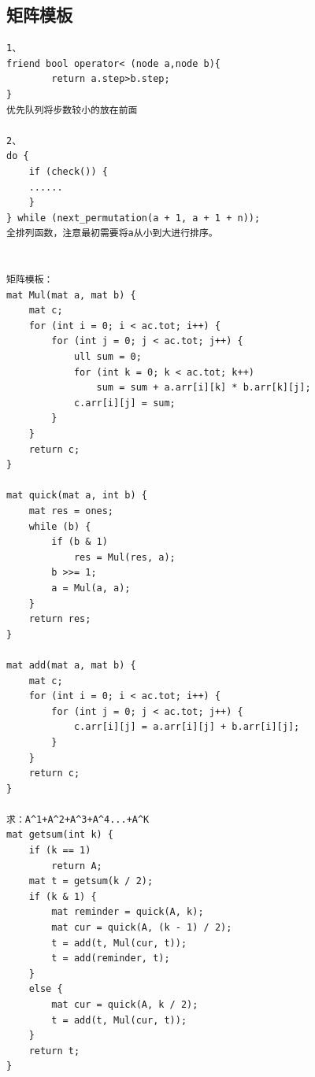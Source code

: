 \documentclass[twoside]{article}
\begin{document}
\subsection{矩阵模板}
\begin{lstlisting}
1、
friend bool operator< (node a,node b){
		return a.step>b.step;
}
优先队列将步数较小的放在前面

2、
do {
    if (check()) {
	......
    }
} while (next_permutation(a + 1, a + 1 + n));
全排列函数，注意最初需要将a从小到大进行排序。


矩阵模板：
mat Mul(mat a, mat b) {
	mat c;
	for (int i = 0; i < ac.tot; i++) {
		for (int j = 0; j < ac.tot; j++) {
			ull sum = 0;
			for (int k = 0; k < ac.tot; k++)
				sum = sum + a.arr[i][k] * b.arr[k][j];
			c.arr[i][j] = sum;
		}
	}
	return c;
}

mat quick(mat a, int b) {
	mat res = ones;
	while (b) {
		if (b & 1)
			res = Mul(res, a);
		b >>= 1;
		a = Mul(a, a);
	}
	return res;
}

mat add(mat a, mat b) {
	mat c;
	for (int i = 0; i < ac.tot; i++) {
		for (int j = 0; j < ac.tot; j++) {
			c.arr[i][j] = a.arr[i][j] + b.arr[i][j];
		}
	}
	return c;
}

求：A^1+A^2+A^3+A^4...+A^K
mat getsum(int k) {
	if (k == 1)
		return A;
	mat t = getsum(k / 2);
	if (k & 1) {
		mat reminder = quick(A, k);
		mat cur = quick(A, (k - 1) / 2);
		t = add(t, Mul(cur, t));
		t = add(reminder, t);
	}
	else {
		mat cur = quick(A, k / 2);
		t = add(t, Mul(cur, t));
	}
	return t;
}\end{lstlisting}
\end{document}
